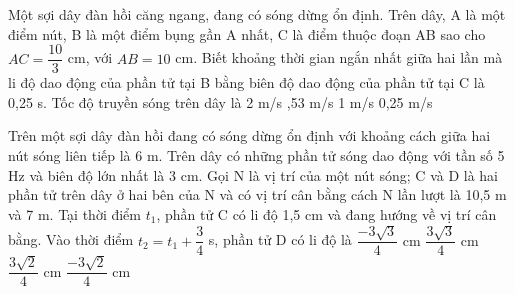 \begin{ex}%
Một sợi dây đàn hồi căng ngang, đang có sóng dừng ổn định. Trên dây, A là một điểm nút, B là một điểm bụng gần A nhất, C là điểm thuộc đoạn AB sao cho $AC=\dfrac{10}{3}$ cm, với $AB=10$ cm. Biết khoảng thời gian ngắn nhất giữa hai lần mà li độ dao động của phần tử tại B bằng biên độ dao động của phần tử tại C là 0,25 s. Tốc độ truyền sóng trên dây là
\choice
{2 m/s}
{,53 m/s}
{1 m/s}
{0,25 m/s}
\end{ex} 
\begin{ex}%
Trên một sợi dây đàn hồi đang có sóng dừng ổn định với khoảng cách giữa hai nút sóng liên tiếp là 6 m. Trên dây có những phần tử sóng dao động với tần số 5 Hz và biên độ lớn nhất là 3 cm. Gọi N là vị trí của một nút sóng; C và D là hai phần tử trên dây ở hai bên của N và có vị trí cân bằng cách N lần lượt là 10,5 m và 7 m. Tại thời điểm $t_1$, phần tử C có li độ 1,5 cm và đang hướng về vị trí cân bằng. Vào thời điểm $t_2=t_1 +\dfrac{3}{4}$ s, phần tử D có li độ là
\choice
{$\dfrac{-3\sqrt3}{4}$ cm}
{$\dfrac{3\sqrt3}{4}$ cm}
{$\dfrac{3\sqrt2}{4}$ cm}
{\True $\dfrac{-3\sqrt2}{4}$ cm}

\end{ex} 


